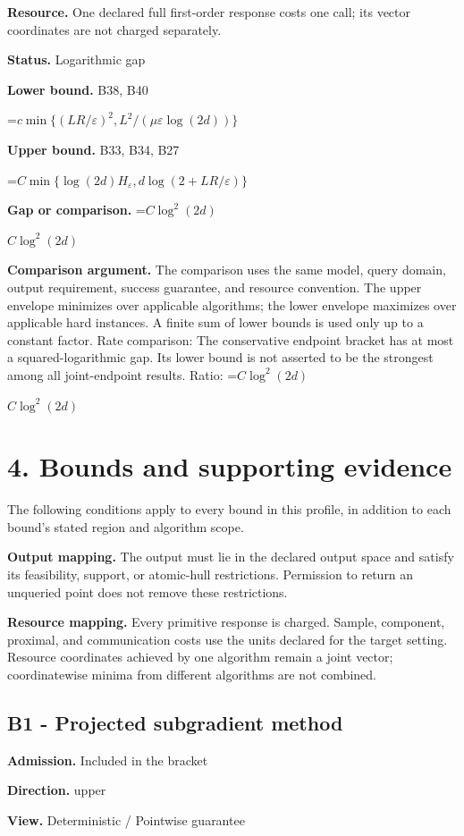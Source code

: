 \documentclass[10pt,a4paper]{article}
\newcommand{\AtlasMath}[1]{\par\begingroup\centering\setbox0=\hbox{$\displaystyle #1$}\ifdim\wd0>1.4\linewidth\typeout{ATLAS WIDE FORMULA: \the\wd0}\fi\ifdim\wd0>\linewidth\resizebox{\linewidth}{!}{\box0}\else\box0\fi\par\endgroup}
\newcommand{\AtlasInlineMath}[1]{\begingroup\setbox0=\hbox{$#1$}\ifdim\wd0>.4\linewidth\endgroup\AtlasMath{#1}\else\endgroup$#1$\fi}
\begin{document}
\textbf{Resource.} One declared full first-order response costs one call; its vector coordinates are not charged separately.

\textbf{Status.} Logarithmic gap

\textbf{Lower bound.} B38, B40

\AtlasMath{c\min\{(LR/\varepsilon)^2,L^2/(\mu\varepsilon\log(2d))\}}
\textbf{Upper bound.} B33, B34, B27

\AtlasMath{C\min\{\log(2d)H_\varepsilon,d\log(2+LR/\varepsilon)\}}
\textbf{Gap or comparison.} \AtlasInlineMath{C\log^2(2d)}

\textbf{Comparison argument.} The comparison uses the same model, query domain, output requirement, success guarantee, and resource convention. The upper envelope minimizes over applicable algorithms; the lower envelope maximizes over applicable hard instances. A finite sum of lower bounds is used only up to a constant factor. Rate comparison: The conservative endpoint bracket has at most a squared-logarithmic gap. Its lower bound is not asserted to be the strongest among all joint-endpoint results. Ratio: \AtlasInlineMath{C\log^2(2d)}

\section{4. Bounds and supporting evidence}
The following conditions apply to every bound in this profile, in addition to each bound's stated region and algorithm scope.

\textbf{Output mapping.} The output must lie in the declared output space and satisfy its feasibility, support, or atomic-hull restrictions. Permission to return an unqueried point does not remove these restrictions.

\textbf{Resource mapping.} Every primitive response is charged. Sample, component, proximal, and communication costs use the units declared for the target setting. Resource coordinates achieved by one algorithm remain a joint vector; coordinatewise minima from different algorithms are not combined.

\subsection{B1 - Projected subgradient method}
\textbf{Admission.} Included in the bracket

\textbf{Direction.} upper

\textbf{View.} Deterministic / Pointwise guarantee
\end{document}
